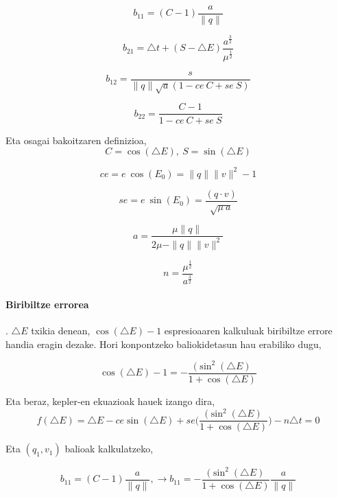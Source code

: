 \begin{equation*}
b_{11}=(C-1) \frac{a}{\|q\|}
\end{equation*}

\begin{equation*}
b_{21}=\triangle t+(S-\triangle E) \frac{a^{\frac{3}{2}}}{\mu^{\frac{1}{2}}}
\end{equation*}

\begin{equation*}
b_{12}=\frac{s}{\|q\| \sqrt{a} (1-ce \ C +se \ S)}
\end{equation*}

\begin{equation*}
b_{22}=\frac{C-1}{1-ce \ C+ se \ S}
\end{equation*}

Eta osagai bakoitzaren definizioa,
\begin{equation*}
C=\cos(\triangle E), \ S=\sin(\triangle E)
\end{equation*}

\begin{equation*}
ce=e \ \cos(E_0) = \|q\| \|v\|^2-1
\end{equation*}

\begin{equation*}
se= e \ \sin(E_0)=\frac{(q \cdot v)}{\sqrt{\mu \ a}}
\end{equation*}

\begin{equation*}
a= \frac{\mu \|q\|}{2\mu-\|q\|\|v\|^2}
\end{equation*}

\begin{equation*}
n= \frac{\mu^{\frac{1}{2}}}{a^{\frac{3}{2}}}
\end{equation*}

\paragraph*{\textbf{Biribiltze errorea}}. $\triangle E$ txikia denean, $\cos(\triangle E)-1$ espresioaaren kalkuluak biribiltze errore handia eragin dezake. Hori konpontzeko baliokidetasun hau erabiliko dugu,

\begin{equation*}
\cos(\triangle E)-1=-\frac{(\sin^2(\triangle E)}{1+\cos(\triangle E)}
\end{equation*}  

Eta beraz, kepler-en ekuazioak hauek izango dira,
\begin{equation*}
f(\triangle E)=\triangle E - ce \sin(\triangle E)+ se \bigg(\frac{(\sin^2(\triangle E)}{1+\cos(\triangle E)}\bigg)-n \triangle t=0
\end{equation*}

Eta $(q_1,v_1)$ balioak kalkulatzeko,

\begin{equation*}
b_{11}=(C-1) \frac{a}{\|q\|}, \longrightarrow b_{11}=-\frac{(\sin^2(\triangle E)}{1+\cos(\triangle E)} \frac{a}{\|q\|}
\end{equation*}


